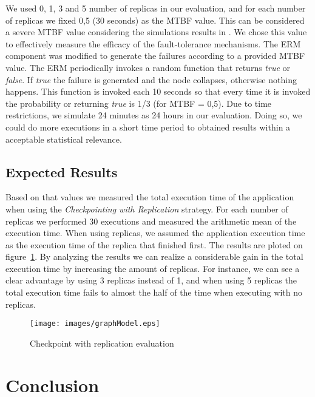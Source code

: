 \documentclass[times, 10pt, twocolumn]{article}
\begin{document}
We used 0, 1, 3 and 5 number of replicas in our evaluation, and for each number
of replicas we fixed 0,5 (30 seconds) as the MTBF value. This can be considered
a severe MTBF value considering the simulations results in \cite{sallem07}. We
chose this value to effectively measure the efficacy of the fault-tolerance
mechanisms. The ERM component was modified to generate the failures according to
a provided MTBF value. The ERM periodically invokes a random function that
returns \emph{true} or \emph{false}. If \emph{true} the failure is generated
and the node collapses, otherwise nothing happens. This function is invoked
each 10 seconds so that every time it is invoked the probability or returning
\emph{true} is 1/3 (for MTBF = 0,5). Due to time restrictions, we simulate 24
minutes as 24 hours in our evaluation. Doing so, we could do more executions in
a short time period to obtained results within a acceptable statistical
relevance.



 
\subsection{Expected Results}

Based on that values we measured the total execution time of the application
when using the \emph{Checkpointing with Replication} strategy. For each number of replicas
we performed 30 executions and measured the arithmetic mean of the execution time. When using
replicas, we assumed the application execution time as the execution time of
the replica that finished first. The results are ploted on
figure~\ref{fig:repCheck}. By analyzing the results we can realize a
considerable gain in the total execution time by increasing the amount of
replicas. For instance, we can see a clear advantage by using 3 replicas
instead of 1, and when using 5 replicas the total execution time fails to
almost the half of the time when executing with no replicas.


\begin{figure}[th]
\centering \texttt{[image: images/graphModel.eps]}
\caption{Checkpoint with replication evaluation}
\label{fig:repCheck}
\end{figure}


\section{Conclusion}
\end{document}

